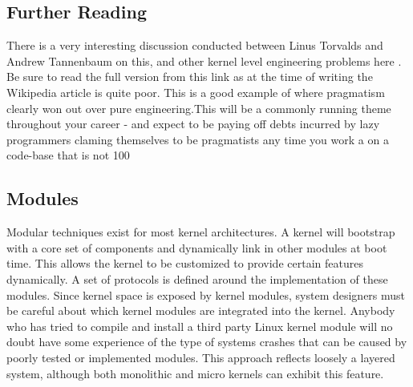 \documentclass[10pt,a4paper]{article}
\begin{document}
\subsection{Further Reading}
There is a very interesting discussion conducted between Linus Torvalds and Andrew Tannenbaum on this, and other kernel level engineering problems here \cite{LINUSTANNEN}. Be sure to read the full version from this link as at the time of writing the Wikipedia article is quite poor. This is a good example of where pragmatism clearly won out over pure engineering.This will be a commonly running theme throughout your career - and expect to be paying off debts incurred by lazy programmers claming themselves to be pragmatists any time you work a on a code-base that is not 100%
\subsection{Modules}
Modular techniques exist for most kernel architectures. A kernel will bootstrap with a core set of components and dynamically link in other modules at boot time. This allows the kernel to be customized to provide certain features dynamically. A set of protocols is defined around the implementation of these modules. Since kernel space is exposed by kernel modules, system designers must be careful about which kernel modules are integrated into the kernel. Anybody who has tried to compile and install a third party Linux kernel module will no doubt have some experience of the type of systems crashes that can be caused by poorly tested or implemented modules. This approach reflects loosely a layered system, although both monolithic and micro kernels can exhibit this feature. 
\end{document}
